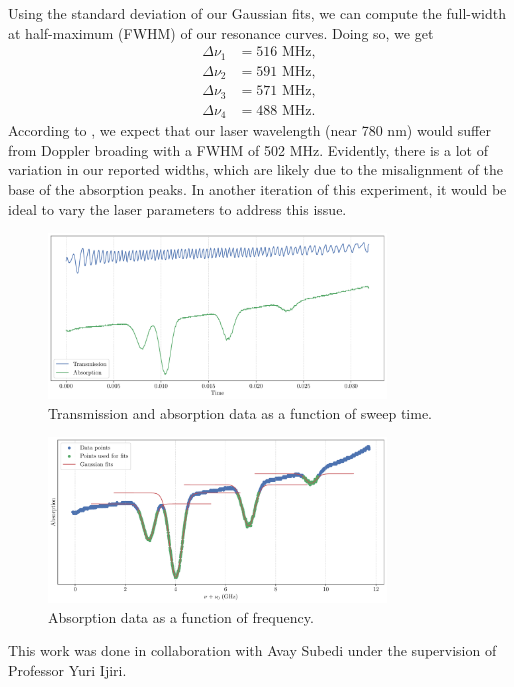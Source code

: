 \documentclass{../paper}
\begin{document}
Using the standard deviation of our Gaussian fits, we can compute the full-width at half-maximum (FWHM) of our resonance curves. Doing so, we get
\begin{align}
  \Delta\nu_1 &= 516 \text{ MHz}, \\
  \Delta\nu_2 &= 591 \text{ MHz}, \\
  \Delta\nu_3 &= 571 \text{ MHz}, \\
  \Delta\nu_4 &= 488 \text{ MHz}.
\end{align}
According to \cite{Brandenberger}, we expect that our laser wavelength (near 780 nm) would suffer from Doppler broading with a FWHM of 502 MHz. Evidently, there is a lot of variation in our reported widths, which are likely due to the misalignment of the base of the absorption peaks. In another iteration of this experiment, it would be ideal to vary the laser parameters to address this issue.

\begin{figure}
  \centering
  \includegraphics[width=0.8\textwidth]{data/time_plot.pdf}
  \caption{Transmission and absorption data as a function of sweep time.}
  \label{fig:time_plot}
\end{figure}

\begin{figure}
  \centering
  \includegraphics[width=0.8\textwidth]{data/analysis.pdf}
  \caption{Absorption data as a function of frequency.}
  \label{fig:analysis}
\end{figure}

\begin{acknowledgements}
  This work was done in collaboration with Avay Subedi under the supervision of Professor Yuri Ijiri.
\end{acknowledgements}


\end{document}
